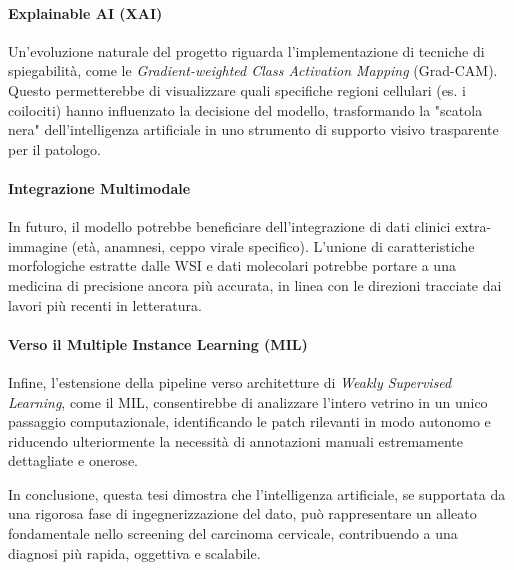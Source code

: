 \paragraph{Explainable AI (XAI)} 
Un'evoluzione naturale del progetto riguarda l'implementazione di tecniche di spiegabilità, come le \textit{Gradient-weighted Class Activation Mapping} (Grad-CAM). Questo permetterebbe di visualizzare quali specifiche regioni cellulari (es. i coilociti) hanno influenzato la decisione del modello, trasformando la "scatola nera" dell'intelligenza artificiale in uno strumento di supporto visivo trasparente per il patologo.

\paragraph{Integrazione Multimodale} 
In futuro, il modello potrebbe beneficiare dell'integrazione di dati clinici extra-immagine (età, anamnesi, ceppo virale specifico). L'unione di caratteristiche morfologiche estratte dalle WSI e dati molecolari potrebbe portare a una medicina di precisione ancora più accurata, in linea con le direzioni tracciate dai lavori più recenti in letteratura.

\paragraph{Verso il Multiple Instance Learning (MIL)} 
Infine, l'estensione della pipeline verso architetture di \textit{Weakly Supervised Learning}, come il MIL, consentirebbe di analizzare l'intero vetrino in un unico passaggio computazionale, identificando le patch rilevanti in modo autonomo e riducendo ulteriormente la necessità di annotazioni manuali estremamente dettagliate e onerose.

\vspace{2cm}
In conclusione, questa tesi dimostra che l'intelligenza artificiale, se supportata da una rigorosa fase di ingegnerizzazione del dato, può rappresentare un alleato fondamentale nello screening del carcinoma cervicale, contribuendo a una diagnosi più rapida, oggettiva e scalabile.